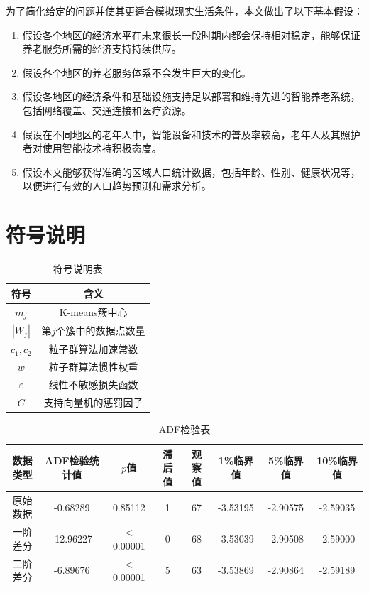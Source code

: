 \documentclass[a4paper]{article}
\begin{document}
为了简化给定的问题并使其更适合模拟现实生活条件，本文做出了以下基本假设：

\begin{enumerate}
    \item 假设各个地区的经济水平在未来很长一段时期内都会保持相对稳定，能够保证养老服务所需的经济支持持续供应。
    \item 假设各个地区的养老服务体系不会发生巨大的变化。
    \item 假设各地区的经济条件和基础设施支持足以部署和维持先进的智能养老系统，包括网络覆盖、交通连接和医疗资源。
    \item 假设在不同地区的老年人中，智能设备和技术的普及率较高，老年人及其照护者对使用智能技术持积极态度。
    \item 假设本文能够获得准确的区域人口统计数据，包括年龄、性别、健康状况等，以便进行有效的人口趋势预测和需求分析。
\end{enumerate}

\section{符号说明}

\begin{table}[H]
    \centering
    \caption{符号说明表}
    \begin{tabular}{cc}
        \toprule
        \textbf{符号} & \textbf{含义} \\
        \midrule
        $m_j$ & K-means簇中心 \\
        $|W_j|$ & 第$j$个簇中的数据点数量 \\
        $c_1, c_2$ & 粒子群算法加速常数 \\
        $w$ & 粒子群算法惯性权重 \\
        $\varepsilon$ & 线性不敏感损失函数 \\
        $C$ & 支持向量机的惩罚因子 \\
        \bottomrule
    \end{tabular}
\end{table}

\begin{table}[H]
    \centering
    \caption{ADF检验表}
    \begin{tabular}{cccccccc}
        \toprule
        \textbf{数据类型} & \textbf{ADF检验统计值} & \textbf{$p$值} & \textbf{滞后值} & \textbf{观察值} & \textbf{1\%临界值} & \textbf{5\%临界值} & \textbf{10\%临界值} \\
        \midrule
        原始数据 & -0.68289 & 0.85112 & 1 & 67 & -3.53195 & -2.90575 & -2.59035 \\
        一阶差分 & -12.96227 & $<$0.00001 & 0 & 68 & -3.53039 & -2.90508 & -2.59000 \\
        二阶差分 & -6.89676 & $<$0.00001 & 5 & 63 & -3.53869 & -2.90864 & -2.59189 \\
        \bottomrule
    \end{tabular}
\end{table}
\end{document}
